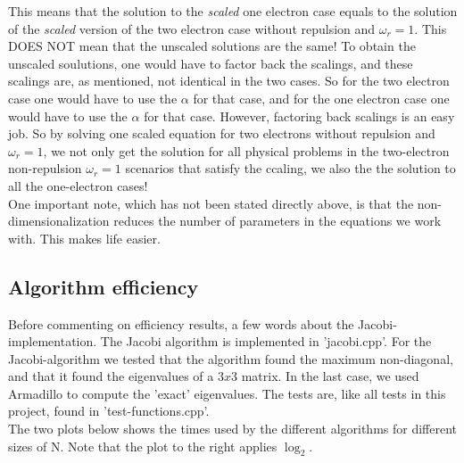\documentclass{article}
\begin{document}
This means that the solution to the \textit{scaled} one electron case equals to the solution of the \textit{scaled} version of the two electron case without repulsion and $\omega_r = 1$. This DOES NOT mean that the unscaled solutions are the same! To obtain the unscaled soulutions, one would have to factor back the scalings, and these scalings are, as mentioned, not identical in the two cases. So for the two electron case one would have to use the $\alpha$ for that case, and for the one electron case one would have to use the $\alpha$ for that case. However, factoring back scalings is an easy job. So by solving one scaled equation for two electrons without repulsion and $\omega_r = 1$, we not only get the solution for all physical problems in the two-electron non-repulsion $\omega_r = 1$ scenarios that satisfy the ccaling, we also the the solution to all the one-electron cases!\\

One important note, which has not been stated directly above, is that the non-dimensionalization reduces the number of parameters in the equations we work with. This makes life easier.

\subsection{Algorithm efficiency}
Before commenting on efficiency results, a few words about the Jacobi-implementation. The Jacobi algorithm is implemented in 'jacobi.cpp'. For the Jacobi-algorithm we tested that the algorithm found the maximum non-diagonal, and that it found the eigenvalues of a $3 x 3$ matrix. In the last case, we used Armadillo to compute the 'exact' eigenvalues. The tests are, like all tests in this project, found in 'test-functions.cpp'.\\

The two plots below shows the times used by the different algorithms for different sizes of N. Note that the plot to the right applies $\log_2$.
\end{document}
